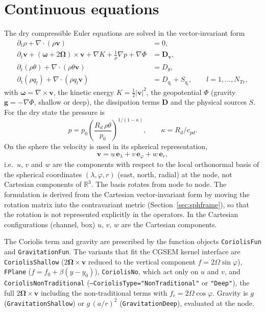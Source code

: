 \documentclass[11pt,a4paper]{article}
\newcommand{\vv}{\bm{v}}
\newcommand{\code}[1]{\texttt{#1}}
\begin{document}
\section{Continuous equations}

The dry compressible Euler equations are solved in the vector-invariant form
\begin{align}
  \partial_t \rho + \nabla\cdot(\rho\vv) &= 0, \label{eq:cont}\\
  \partial_t \vv + (\bm{\omega} + 2\bm{\Omega})\times\vv
    + \nabla K + \frac{1}{\rho}\nabla p + \nabla\Phi &= \bm{D}_{\vv},
    \label{eq:mom}\\
  \partial_t (\rho\theta) + \nabla\cdot(\rho\theta\vv) &= D_{\theta},
    \label{eq:theta}\\
  \partial_t (\rho q_l) + \nabla\cdot(\rho q_l\vv) &= D_{q_l} + S_{q_l},
    \qquad l = 1,\dots,N_{Tr}, \label{eq:tracer}
\end{align}
with $\bm{\omega} = \nabla\times\vv$, the kinetic energy
$K = \tfrac12|\vv|^2$, the geopotential $\Phi$ (gravity
$\bm g = -\nabla\Phi$, shallow or deep), the dissipation terms $\bm D$ and
the physical sources $S$. For the dry state the pressure is
\begin{equation}
  p = p_0\left(\frac{R_d\,\rho\theta}{p_0}\right)^{1/(1-\kappa)},
  \qquad \kappa = R_d/c_{pd}.
\end{equation}
On the sphere the velocity is used in its spherical representation,
\begin{equation}
  \vv = u\,\bm e_\lambda + v\,\bm e_\varphi + w\,\bm e_r ,
\end{equation}
i.e.\ $u$, $v$ and $w$ are the components with respect to the local
orthonormal basis of the spherical coordinates $(\lambda,\varphi,r)$ (east,
north, radial) at the node, not Cartesian components of $\mathbb R^3$. The
basis rotates from node to node. The formulation is derived from the
Cartesian vector-invariant form by moving the rotation matrix into the
contravariant metric (Section~\ref{sec:sphframe}), so that the rotation is
not represented explicitly in the operators. In the Cartesian configurations (channel,
box) $u$, $v$, $w$ are the Cartesian components.

The Coriolis term and gravity are prescribed by the function objects
\code{CoriolisFun} and \code{GravitationFun}. The variants that fit the
CGSEM kernel interface are \code{CoriolisShallow}
($2\bm\Omega\times\vv$ reduced to the vertical component
$f = 2\Omega\sin\varphi$), \code{FPlane} ($f = f_0 + \beta(y-y_0)$),
\code{CoriolisNo}, which act only on $u$ and $v$, and
\code{CoriolisNonTraditional} (\code{--CoriolisType="NonTraditional"} or
\code{"Deep"}), the full $2\bm\Omega\times\vv$ including the
non-traditional terms with $f_c = 2\Omega\cos\varphi$. Gravity is
$g$ (\code{GravitationShallow}) or $g\,(a/r)^2$ (\code{GravitationDeep}),
evaluated at the node.
\end{document}
